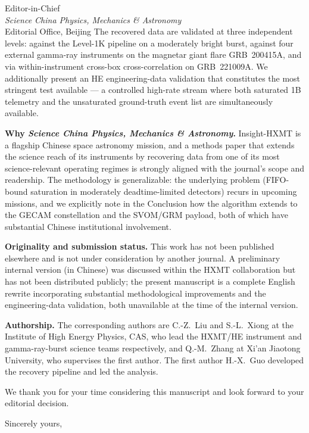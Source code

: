 \documentclass[11pt,a4paper]{letter}
\begin{document}
\begin{letter}{Editor-in-Chief \\ \emph{Science China Physics, Mechanics \& Astronomy} \\
Editorial Office, Beijing}
The recovered data are validated at three independent levels: against the
Level-1K pipeline on a moderately bright burst, against four external
gamma-ray instruments on the magnetar giant flare GRB~200415A, and via
within-instrument cross-box cross-correlation on GRB~221009A.
We additionally present an HE engineering-data validation that constitutes
the most stringent test available --- a controlled high-rate stream where
both saturated 1B telemetry and the unsaturated ground-truth event list
are simultaneously available.

\textbf{Why \emph{Science China Physics, Mechanics \& Astronomy}.} Insight-HXMT
is a flagship Chinese space astronomy mission, and a methods paper that
extends the science reach of its instruments by recovering data from one of
its most science-relevant operating regimes is strongly aligned with the
journal's scope and readership. The methodology is generalizable: the
underlying problem (FIFO-bound saturation in moderately deadtime-limited
detectors) recurs in upcoming missions, and we explicitly note in the
Conclusion how the algorithm extends to the GECAM constellation and the
SVOM/GRM payload, both of which have substantial Chinese institutional
involvement.

\textbf{Originality and submission status.} This work has not been published
elsewhere and is not under consideration by another journal. A preliminary
internal version (in Chinese) was discussed within the HXMT collaboration
but has not been distributed publicly; the present manuscript is a complete
English rewrite incorporating substantial methodological improvements and
the engineering-data validation, both unavailable at the time of the
internal version.

\textbf{Authorship.} The corresponding authors are C.-Z.~Liu and S.-L.~Xiong
at the Institute of High Energy Physics, CAS, who lead the HXMT/HE
instrument and gamma-ray-burst science teams respectively, and Q.-M.~Zhang
at Xi'an Jiaotong University, who supervises the first author. The first
author H.-X.~Guo developed the recovery pipeline and led the analysis.

We thank you for your time considering this manuscript and look forward to
your editorial decision.

\closing{Sincerely yours,}

\end{letter}
\end{document}
